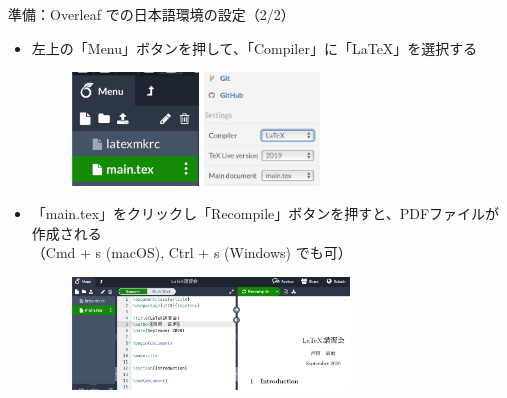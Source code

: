 \documentclass[dvipdfmx]{beamer}
\begin{document}
\begin{frame}{準備：Overleaf での日本語環境の設定（2/2）}
\begin{itemize}
    \item 左上の「Menu」ボタンを押して、「Compiler」に「LaTeX」を選択する
    \begin{figure}
        \centering
        \includegraphics[height=3cm]{./figures/Menu.pdf}\qquad
        \includegraphics[height=3cm]{./figures/Compiler.pdf}
    \end{figure}
    \item 「main.tex」をクリックし「Recompile」ボタンを押すと、PDFファイルが作成される
    \\
    （Cmd + s (macOS), Ctrl + s (Windows) でも可）
    \begin{figure}
        \centering
        \includegraphics[height=3cm]{./figures/fig_preview.pdf}
    \end{figure}
\end{itemize}
\end{frame}
\end{document}

